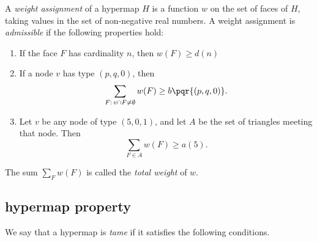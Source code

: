 \begin{definition}
%
A {\it weight assignment\/} of a hypermap $H$ is a function $w$ on
the set of faces of $H$, taking values in the set of non-negative
real numbers. A weight assignment is {\it admissible} if the
following properties hold:
%
\begin{enumerate}
  \item If the face $F$ has cardinality $n$, then
        $w(F) \ge d(n)$
  \item If a node $v$ has type $(p,q,0)$, then
        $$\sum_{F:\,v\cap F\ne\emptyset} w(F) \ge b{\pqr{(p,q,0)}}.$$
        \label{admissible:b}
  \item Let $v$ be any node of type $(5,0,1)$, and let $A$ be the set of
triangles meeting that node.
        Then
        $$\sum_{F\in A} w(F)
            \ge  a(5).$$
        \label{definition:admissible:excess}
\end{enumerate}
The sum $\sum_F w(F)$ is called the {\it total weight} of $w$.
\end{definition}





\subsection{hypermap property}
\label{sec:graphproperty}



We say that a hypermap is {\it tame\/} if it satisfies the following
conditions.
%

